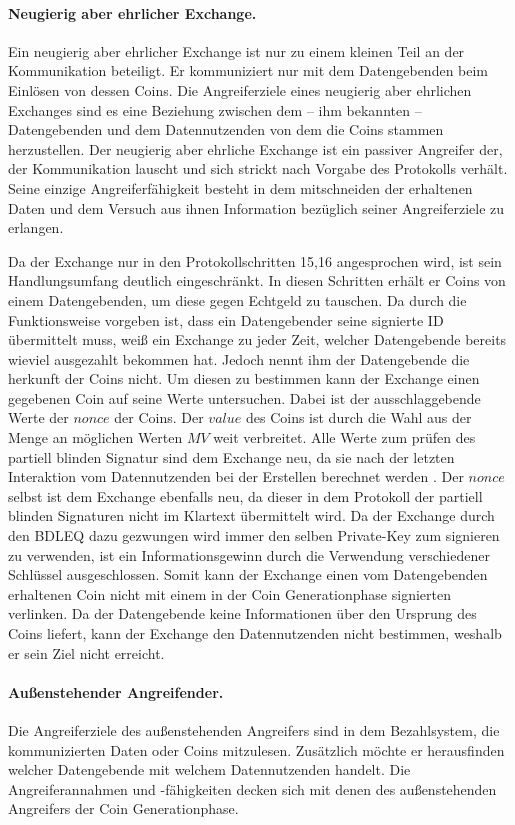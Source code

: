 \documentclass[
	fontsize=12pt,
	headings=small,
	parskip=half,           %
	bibliography=totoc,
	numbers=noenddot,       %
	open=any,               %
]{scrreprt}
\begin{document}
\paragraph{Neugierig aber ehrlicher Exchange.}
Ein neugierig aber ehrlicher Exchange ist nur zu einem kleinen Teil an der Kommunikation beteiligt. Er kommuniziert nur mit dem Datengebenden beim Einlösen von dessen Coins. Die Angreiferziele eines neugierig aber ehrlichen Exchanges sind es eine Beziehung zwischen dem -- ihm bekannten -- Datengebenden und dem Datennutzenden von dem die Coins stammen herzustellen. Der neugierig aber ehrliche Exchange ist ein passiver Angreifer der, der Kommunikation lauscht und sich strickt nach Vorgabe des Protokolls verhält. Seine einzige Angreiferfähigkeit besteht in dem mitschneiden der erhaltenen Daten und dem Versuch aus ihnen Information bezüglich seiner Angreiferziele zu erlangen.

Da der Exchange nur in den Protokollschritten 15,16 angesprochen wird, ist sein Handlungsumfang deutlich eingeschränkt. In diesen Schritten erhält er Coins von einem Datengebenden, um diese gegen Echtgeld zu tauschen. Da durch die Funktionsweise vorgeben ist, dass ein Datengebender seine signierte ID übermittelt muss, weiß ein Exchange zu jeder Zeit, welcher Datengebende bereits wieviel ausgezahlt bekommen hat. Jedoch nennt ihm der Datengebende die herkunft der Coins nicht. Um diesen zu bestimmen kann der Exchange einen gegebenen Coin auf seine Werte untersuchen. Dabei ist der ausschlaggebende Werte der $nonce$ der Coins. Der $value$ des Coins ist durch die Wahl aus der Menge an möglichen Werten $MV$ weit verbreitet. Alle Werte zum prüfen des partiell blinden Signatur sind dem Exchange neu, da sie nach der letzten Interaktion vom Datennutzenden bei der Erstellen berechnet werden \cite{abe2000provably}. Der $nonce$ selbst ist dem Exchange ebenfalls neu, da dieser in dem Protokoll der partiell blinden Signaturen nicht im Klartext übermittelt wird. Da der Exchange durch den BDLEQ dazu gezwungen wird immer den selben Private-Key zum signieren zu verwenden, ist ein Informationsgewinn durch die Verwendung verschiedener Schlüssel ausgeschlossen. Somit kann der Exchange einen vom Datengebenden erhaltenen Coin nicht mit einem in der Coin Generationphase signierten verlinken. Da der Datengebende keine Informationen über den Ursprung des Coins liefert, kann der Exchange den Datennutzenden nicht bestimmen, weshalb er sein Ziel nicht erreicht. 

\paragraph{Außenstehender Angreifender.}
Die Angreiferziele des außenstehenden Angreifers sind in dem Bezahlsystem, die kommunizierten Daten oder Coins mitzulesen. Zusätzlich möchte er herausfinden welcher Datengebende mit welchem Datennutzenden handelt. Die Angreiferannahmen und -fähigkeiten decken sich mit denen des außenstehenden Angreifers der Coin Generationphase.
\end{document}
